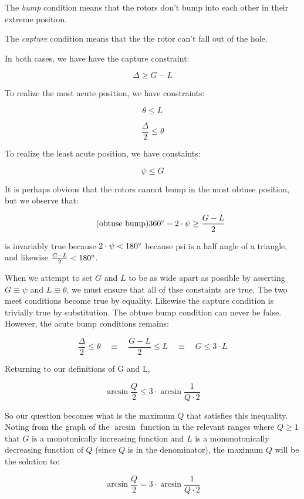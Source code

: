 \documentclass[12pt]{article}
\begin{document}
The \textit{bump} condition means that the rotors don't bump into each other
in their extreme position.

The \textit{capture} condition means that the the rotor can't fall out of the hole.

In both cases, we have have the capture constraint:

\[ \tag{capture} \Delta \geq G - L \]

To realize the most acute position, we have constraints:

\[ \tag{acute meet} \theta \leq L \]

\[ \tag{acute bump} \frac{\Delta}{2} \leq \theta  \]

To realize the least acute position, we have constaints:

\[ \tag{obtuse meet}  \psi \leq G \]

It is perhaps obvious that the rotors cannot bump in the most obtuse position, but we observe that:

\[ \tag{obtuse bump} 360\degree - 2\cdot \psi \geq \frac{G - L}{2} \]

is invariably true because $2\cdot\psi < 180\degree$ because psi is a half angle of a triangle, and likewise $\frac{G - L}{2} < 180\degree$.

When we attempt to set $G$ and $L$ to be as wide apart as possible by asserting $G \equiv \psi$ and $L \equiv \theta$, we must
ensure that all of thse constaints are true. The two meet conditions become true by equality. Likewise the capture condition
is trivially true by substitution. The obtuse bump condition can
never be false.  However, the acute bump conditions remains:

\[ \tag{acute bump} \frac{\Delta}{2} \leq \theta  \quad \equiv \quad \frac{G - L}{2} \leq L  \quad \equiv \quad G \leq 3 \cdot L \]

Returning to our definitions of G and L,

\[ \arcsin{\frac{Q}{2}} \leq 3 \cdot \arcsin{\frac{1}{Q \cdot 2}} \]

So our question becomes what is the maximum $Q$ that satisfies this inequality. Noting from the graph of the $\arcsin$ function in
the relevant ranges where $Q \geq 1$ that $G$ is a monotonically increasing function and $L$ is a
mononotonically decreasing function of $Q$ (since $Q$ is in the denominator), the maximum $Q$ will be the solution to:

\[\tag{original}  \arcsin{\frac{Q}{2}} = 3 \cdot \arcsin{\frac{1}{Q \cdot 2}} \]
\end{document}
